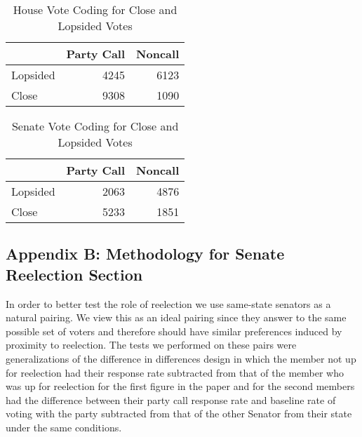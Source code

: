 \documentclass[12pt]{article}
\begin{document}
\begin{table}[H]
	\centering
	\caption{House Vote Coding for Close and Lopsided Votes} 
	\begin{tabular}{lrr}
		\hline
		& Party Call & Noncall \\ 
		\hline
		Lopsided & 4245 & 6123 \\ 
		Close & 9308 & 1090 \\ 
		\hline
	\end{tabular}
\end{table}

\begin{table}[H]
	\centering
	\caption{Senate Vote Coding for Close and Lopsided Votes} 
	\begin{tabular}{lrr}
		\hline
		& Party Call & Noncall \\ 
		\hline
		Lopsided & 2063 & 4876 \\ 
		Close & 5233 & 1851 \\ 
		\hline
	\end{tabular}
\end{table}













\subsection{Appendix B: Methodology for Senate Reelection Section}

In order to better test the role of reelection we use same-state senators as a natural pairing. We view this as an ideal pairing since they answer to the same possible set of voters and therefore should have similar preferences induced by proximity to reelection. The tests we performed on these pairs were generalizations of the difference in differences design in which the member not up for reelection had their response rate subtracted from that of the member who was up for reelection for the first figure in the paper and for the second members had the difference between their party call response rate and baseline rate of voting with the party subtracted from that of the other Senator from their state under the same conditions. 
\end{document}
